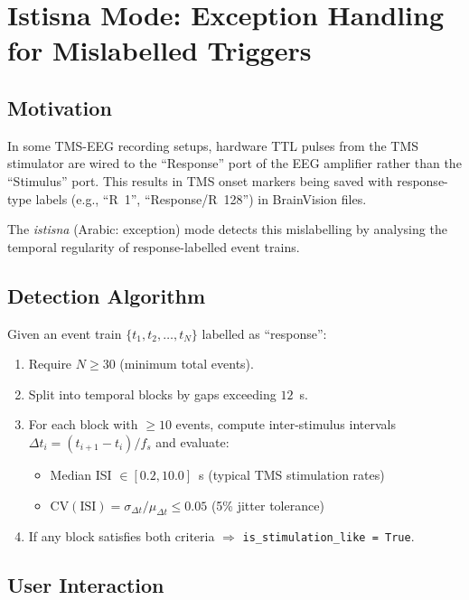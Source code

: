 \documentclass[11pt,a4paper]{article}
\begin{document}
\section{Istisna Mode: Exception Handling for Mislabelled Triggers}
\label{sec:istisna}

\subsection{Motivation}

In some TMS-EEG recording setups, hardware TTL pulses from the TMS stimulator are wired to
the ``Response'' port of the EEG amplifier rather than the ``Stimulus'' port. This results
in TMS onset markers being saved with response-type labels (e.g., ``R~1'', ``Response/R~128'')
in BrainVision files.

The \emph{istisna} (Arabic: exception) mode detects this mislabelling by analysing the temporal
regularity of response-labelled event trains.

\subsection{Detection Algorithm}

Given an event train $\{t_1, t_2, \ldots, t_N\}$ labelled as ``response'':

\begin{enumerate}[leftmargin=2em]
  \item Require $N \geq 30$ (minimum total events).
  \item Split into temporal blocks by gaps exceeding $12$~s.
  \item For each block with $\geq 10$ events, compute inter-stimulus intervals
        $\Delta t_i = (t_{i+1} - t_i) / f_s$ and evaluate:
        \begin{itemize}[leftmargin=1.5em]
          \item Median ISI $\in [0.2, 10.0]$~s \quad (typical TMS stimulation rates)
          \item $\mathrm{CV}(\mathrm{ISI}) = \sigma_{\Delta t} / \mu_{\Delta t} \leq 0.05$
                \quad (5\% jitter tolerance)
        \end{itemize}
  \item If any block satisfies both criteria $\Rightarrow$ \texttt{is\_stimulation\_like = True}.
\end{enumerate}

\subsection{User Interaction}
\end{document}
